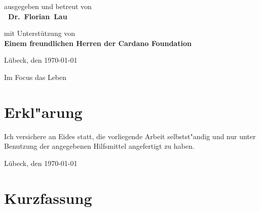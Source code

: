 \documentclass[
	ngerman,
	11pt,
	twoside,
	a4paper,
	headsepline,
	footsepline, 
	toc=bib
]{scrbook}
\begin{document}
\begin{titlepage}
{	\titlepageskip
	ausgegeben und betreut von\\
	\textbf{~Dr.~Florian~Lau}

	\titlepageskip
	{
		mit Unterstützung von\\
		\textbf{Einem freundlichen Herren der Cardano Foundation}\\
	}


	\vfill
	{
		Lübeck, den \today
	}

	{
		\titlepageskip
		Im Focus das Leben
	}
}
\end{titlepage}
\restoregeometry

\cleardoublepage

\newpage
\chapter*{Erkl"arung}

Ich versichere an Eides statt, die vorliegende Arbeit selbstst"andig und nur unter Benutzung
der angegebenen Hilfsmittel angefertigt zu haben.

\vspace*{3cm}
Lübeck, den \today

\thispagestyle{empty}
\cleardoublepage



\chapter*{Kurzfassung}
\end{document}
